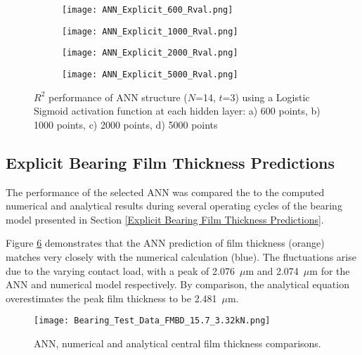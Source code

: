 \begin{figure}
	\centering
	\begin{subfigure}[b]{0.49\textwidth}
		\centering
		\texttt{[image: ANN\_Explicit\_600\_Rval.png]}
		\caption{}
		\label{600_Rval}
	\end{subfigure}
	\hfill
	\begin{subfigure}[b]{0.49\textwidth}
		\centering
		\texttt{[image: ANN\_Explicit\_1000\_Rval.png]}
		\caption{}
		\label{1000_Rval}
	\end{subfigure}
	\hfill
	\begin{subfigure}[b]{0.49\textwidth}
		\centering
		\texttt{[image: ANN\_Explicit\_2000\_Rval.png]}
		\caption{}
		\label{2000_Rval}
	\end{subfigure}
	\hfill
	\begin{subfigure}[b]{0.49\textwidth}
		\centering
		\texttt{[image: ANN\_Explicit\_5000\_Rval.png]}
		\caption{}
		\label{5000_Rval}
	\end{subfigure}
	\caption{$R^2$ performance of ANN structure ($N$=14, $t$=3) using a Logistic Sigmoid activation function at each hidden layer: a) 600 points, b) 1000 points, c) 2000 points, d) 5000 points}
	\label{$R^2$ performance of ANN structure}
\end{figure}


\subsection{Explicit Bearing Film Thickness Predictions}

The performance of the selected ANN was compared the to the computed numerical and analytical results during several operating cycles of the bearing model presented in Section \ref{Explicit Bearing Film Thickness Predictions}.

Figure \ref{ANN Film Thickness Comparisons} demonstrates that the ANN prediction of film thickness (orange) matches very closely with the numerical calculation (blue). The fluctuations arise due to the varying contact load, with a peak of 2.076~$\mu \mathrm{m}$ and 2.074~$\mu \mathrm{m}$ for the ANN and numerical model respectively. By comparison, the analytical equation overestimates the peak film thickness to be 2.481~$\mu \mathrm{m}$.

\begin{figure}
	\centering
	\texttt{[image: Bearing\_Test\_Data\_FMBD\_15.7\_3.32kN.png]}
	\caption{ANN, numerical and analytical central film thickness comparisons.}
	\label{ANN Film Thickness Comparisons}
\end{figure}

